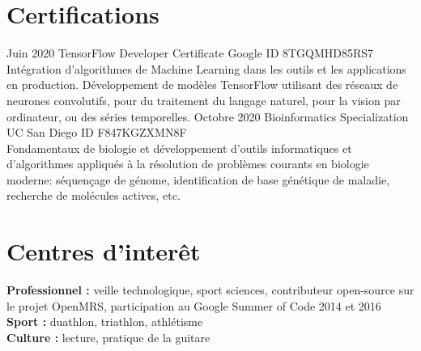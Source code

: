 \documentclass[]{cv-style}          %
\begin{document}

\section{Certifications}

\begin{entrylist}
\entry
{Juin 2020}
{TensorFlow Developer Certificate}
{Google}
{ID 8TGQMHD85RS7 \\ Intégration d'algorithmes de Machine Learning dans les outils et les applications en production. Développement de modèles TensorFlow utilisant des réseaux de neurones convolutifs, pour du traitement du langage naturel, pour la vision par ordinateur, ou des séries temporelles.}
\entry
{Octobre 2020}
{Bioinformatics Specialization}
{UC San Diego}
{ID F847KGZXMN8F \\ Fondamentaux de biologie et développement d'outils informatiques et d'algorithmes appliqués à la résolution de problèmes courants en biologie moderne: séquençage de génome, identification de base génétique de maladie, recherche de molécules actives, etc.}
\end{entrylist}


\section{Centres d'interêt}
  \vspace{-0.2cm}
  
\textbf{Professionnel :} veille technologique, sport sciences, contributeur open-source sur le projet OpenMRS, participation au Google Summer of Code 2014 et 2016 \\
\textbf{Sport :} duathlon, triathlon, athlétisme \\
\textbf{Culture :} lecture, pratique de la guitare
\end{document}

